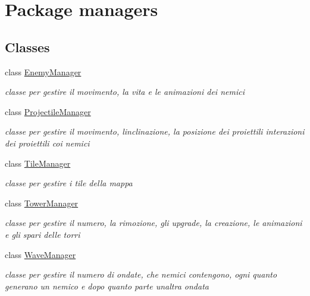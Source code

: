 \hypertarget{namespacemanagers}{}\section{Package managers}
\label{namespacemanagers}
\subsection*{Classes}
\begin{DoxyCompactItemize}
\item 
class \hyperlink{classmanagers_1_1_enemy_manager}{Enemy\+Manager}
\begin{DoxyCompactList}\small\item\em classe per gestire il movimento, la vita e le animazioni dei nemici \end{DoxyCompactList}\item 
class \hyperlink{classmanagers_1_1_projectile_manager}{Projectile\+Manager}
\begin{DoxyCompactList}\small\item\em classe per gestire il movimento, l\textquotesingle{}inclinazione, la posizione dei proiettili interazioni dei proiettili coi nemici \end{DoxyCompactList}\item 
class \hyperlink{classmanagers_1_1_tile_manager}{Tile\+Manager}
\begin{DoxyCompactList}\small\item\em classe per gestire i tile della mappa \end{DoxyCompactList}\item 
class \hyperlink{classmanagers_1_1_tower_manager}{Tower\+Manager}
\begin{DoxyCompactList}\small\item\em classe per gestire il numero, la rimozione, gli upgrade, la creazione, le animazioni e gli spari delle torri \end{DoxyCompactList}\item 
class \hyperlink{classmanagers_1_1_wave_manager}{Wave\+Manager}
\begin{DoxyCompactList}\small\item\em classe per gestire il numero di ondate, che nemici contengono, ogni quanto generano un nemico e dopo quanto parte un\textquotesingle{}altra ondata \end{DoxyCompactList}\end{DoxyCompactItemize}
